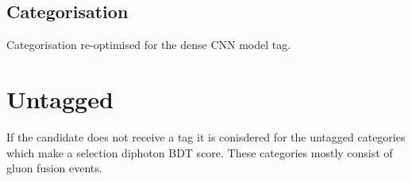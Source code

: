 \subsection{Categorisation}
Categorisation re-optimised for the dense CNN model tag.





\section{Untagged}
If the candidate does not receive a tag it is conisdered for the untagged categories which make a selection diphoton BDT score. These categories mostly consist of gluon fusion events. 


